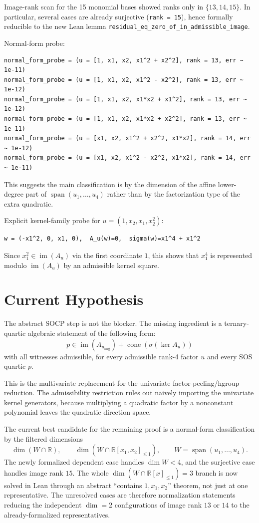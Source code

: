 \documentclass[11pt]{article}
\begin{document}
Image-rank scan for the 15 monomial bases showed ranks only in
$\{13,14,15\}$. In particular, several cases are already surjective
(\texttt{rank = 15}), hence formally reducible to the new Lean lemma
\texttt{residual\_eq\_zero\_of\_in\_admissible\_image}.

Normal-form probe:
\begin{verbatim}
normal_form_probe = (u = [1, x1, x2, x1^2 + x2^2], rank = 13, err ~ 1e-11)
normal_form_probe = (u = [1, x1, x2, x1^2 - x2^2], rank = 13, err ~ 1e-12)
normal_form_probe = (u = [1, x1, x2, x1*x2 + x1^2], rank = 13, err ~ 1e-12)
normal_form_probe = (u = [1, x1, x2, x1*x2 + x2^2], rank = 13, err ~ 1e-11)
normal_form_probe = (u = [x1, x2, x1^2 + x2^2, x1*x2], rank = 14, err ~ 1e-12)
normal_form_probe = (u = [x1, x2, x1^2 - x2^2, x1*x2], rank = 14, err ~ 1e-11)
\end{verbatim}

This suggests the main classification is by the dimension of the affine
lower-degree part of $\operatorname{span}(u_1,\dots,u_4)$ rather than by the
factorization type of the extra quadratic.

Explicit kernel-family probe for $u=(1,x_2,x_1,x_2^2)$:
\begin{verbatim}
w = (-x1^2, 0, x1, 0),  A_u(w)=0,  sigma(w)=x1^4 + x1^2
\end{verbatim}

Since $x_1^2 \in \operatorname{im}(A_u)$ via the first coordinate $1$, this
shows that $x_1^4$ is represented modulo $\operatorname{im}(A_u)$ by an
admissible kernel square.

\section*{Current Hypothesis}
The abstract SOCP step is not the blocker. The missing ingredient is a
ternary-quartic algebraic statement of the following form:
\[
  p \in \operatorname{im}(A_{u_{\mathrm{img}}}) +
      \operatorname{cone}(\sigma(\ker A_u))
\]
with all witnesses admissible, for every admissible rank-4 factor $u$ and every
SOS quartic $p$.

This is the multivariate replacement for the univariate factor-peeling/hgroup
reduction. The admissibility restriction rules out naively importing the
univariate kernel generators, because multiplying a quadratic factor by a
nonconstant polynomial leaves the quadratic direction space.

The current best candidate for the remaining proof is a normal-form
classification by the filtered dimensions
\[
  \dim(W \cap \mathbb{R}), \qquad \dim(W \cap \mathbb{R}[x_1,x_2]_{\le 1}),
  \qquad W = \operatorname{span}(u_1,\dots,u_4).
\]
The newly formalized dependent case handles $\dim W < 4$, and the surjective
case handles image rank $15$. The whole
$\dim(W \cap \mathbb{R}[x]_{\le 1}) = 3$ branch is now solved in Lean through
an abstract ``contains $1,x_1,x_2$'' theorem, not just at one representative.
The unresolved cases are therefore normalization statements reducing the
independent $\dim = 2$ configurations of image rank $13$ or $14$ to the
already-formalized representatives.
\end{document}
